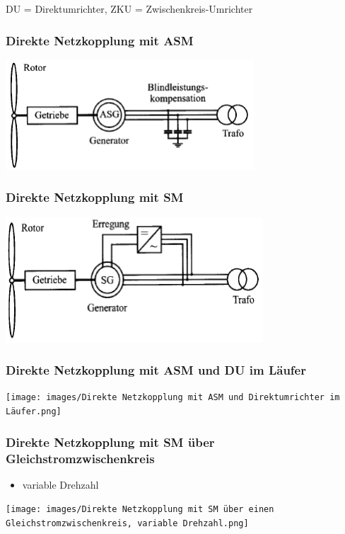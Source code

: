 DU = Direktumrichter, ZKU = Zwischenkreis-Umrichter\\

\subsubsection{Direkte Netzkopplung mit ASM}
\includegraphics[width=0.6\columnwidth]{images/Direkte Netzkopplung mit ASM.png}

\subsubsection{Direkte Netzkopplung mit SM}
\includegraphics[width=0.6\columnwidth]{images/Direkte Netzkopplung mit SM.png}

\subsubsection{Direkte Netzkopplung mit ASM und DU im Läufer}
\texttt{[image: images/Direkte Netzkopplung mit ASM und Direktumrichter im Läufer.png]}

\subsubsection{Direkte Netzkopplung mit SM über Gleichstromzwischenkreis}
\begin{itemize}
    \item variable Drehzahl
\end{itemize}

\vspace{0.1cm}

\texttt{[image: images/Direkte Netzkopplung mit SM über einen Gleichstromzwischenkreis, variable Drehzahl.png]}

